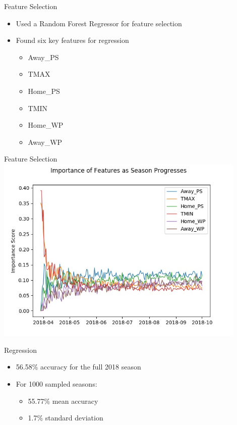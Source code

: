 \documentclass{beamer}
\begin{document}
\begin{frame}{Feature Selection}
    \begin{itemize}
        \item Used a Random Forest Regressor for feature selection
        \item Found six key features for regression
        \begin{itemize}
            \item Away\_PS
            \item TMAX
            \item Home\_PS
            \item TMIN
            \item Home\_WP
            \item Away\_WP
        \end{itemize}
    \end{itemize}
\end{frame}

\begin{frame}{Feature Selection}
    \includegraphics[width=0.9\textwidth]{feature-importance.jpg}
\end{frame}

\begin{frame}{Regression}
    \begin{itemize}
        \item 56.58\% accuracy for the full 2018 season
        \item For 1000 sampled seasons:
        \begin{itemize}
            \item 55.77\% mean accuracy
            \item 1.7\% standard deviation
        \end{itemize}
    \end{itemize}
\end{frame}
\end{document}
